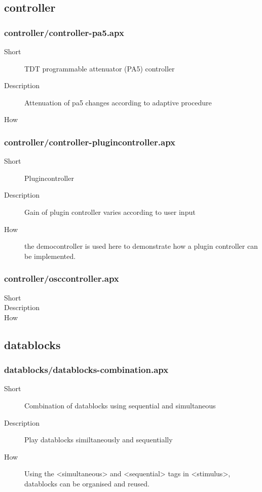 \subsection{controller}
\subsubsection{controller/controller-pa5.apx}
\begin{description}
\item[Short] 
 TDT programmable attenuator (PA5) controller
\item[Description] 
 Attenuation of pa5 changes according to adaptive procedure
\item[How] 

\end{description}

\subsubsection{controller/controller-plugincontroller.apx}
\begin{description}
\item[Short] 
 Plugincontroller
\item[Description] 
 Gain of plugin controller varies according to user input
\item[How] 
 the democontroller is used here to demonstrate how a plugin controller can be implemented.
\end{description}

\subsubsection{controller/osccontroller.apx}
\begin{description}
\item[Short] 
\item[Description] 
\item[How] 
\end{description}

\subsection{datablocks}
\subsubsection{datablocks/datablocks-combination.apx}
\begin{description}
\item[Short] 
 Combination of datablocks using sequential and simultaneous
\item[Description] 
  Play datablocks similtaneously and sequentially
\item[How] 
 Using the \textless{}simultaneous\textgreater{} and \textless{}sequential\textgreater{} tags in \textless{}stimulus\textgreater{}, datablocks can be organised and reused.
\end{description}

